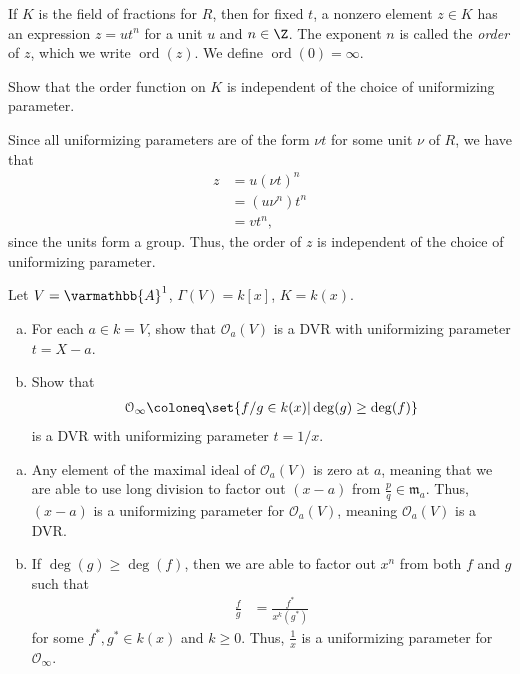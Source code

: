 \documentclass[10pt]{mypackage}
\renewcommand*{\mathbb}[1]{\varmathbb{#1}}
\newcommand{\A}{\mathbb{A}}
\begin{document}
If $K$ is the field of fractions for $R$, then for fixed $t$, a nonzero element $z\in K$ has an expression $z = ut^{n}$ for a unit $u$ and $n\in\Z$. The exponent $n$ is called the \textit{order} of $z$, which we write $\operatorname{ord}\left( z \right)$. We define $\operatorname{ord}\left( 0 \right) = \infty$.
\begin{exercise}[Exercise 2.23]
Show that the order function on $K$ is independent of the choice of uniformizing parameter.
\end{exercise}
\begin{solution}
  Since all uniformizing parameters are of the form $\nu t$ for some unit $\nu$ of $R$, we have that 
  \begin{align*}
    z &= u\left( \nu t \right)^{n}\\
      &= \left( u\nu^{n} \right) t^{n}\\
      &= vt^{n},
  \end{align*}
  since the units form a group. Thus, the order of $z$ is independent of the choice of uniformizing parameter.
\end{solution}
\begin{exercise}[Exercise 2.24]
  Let $V = \A^1$, $\Gamma(V) = k\left[ x \right]$, $K = k(x)$.
  \begin{enumerate}[(a)]
    \item For each $a\in k = V$, show that $\mathcal{O}_a(V)$ is a DVR with uniformizing parameter $t = X-a$.
    \item Show that 
      \begin{align*}
        \mathcal{O}_{\infty}\coloneq \set{f/g\in k(x) | \deg(g)\geq \deg(f)}
      \end{align*}
      is a DVR with uniformizing parameter $t = 1/x$.
  \end{enumerate}
\end{exercise}
\begin{solution}\hfill
  \begin{enumerate}[(a)]
    \item Any element of the maximal ideal of $\mathcal{O}_a\left( V \right)$ is zero at $a$, meaning that we are able to use long division to factor out $\left( x-a \right)$ from $\frac{p}{q}\in \mathfrak{m}_a$. Thus, $\left( x-a \right)$ is a uniformizing parameter for $\mathcal{O}_a(V)$, meaning $\mathcal{O}_a(V)$ is a DVR.
    \item If $\deg\left( g \right)\geq \deg\left( f \right)$, then we are able to factor out $x^{n}$ from both $f$ and $g$ such that
      \begin{align*}
        \frac{f}{g} &= \frac{f^{\ast}}{x^{k}\left( g^{\ast} \right)}
      \end{align*}
      for some $f^{\ast},g^{\ast}\in k\left( x \right)$ and $k\geq 0$. Thus, $\frac{1}{x}$ is a uniformizing parameter for $\mathcal{O}_{\infty}$.
  \end{enumerate}
\end{solution}
\end{document}
